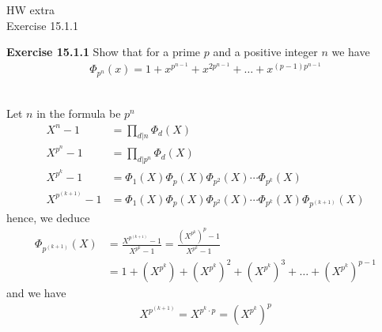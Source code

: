 \documentclass{article}
\begin{document}
\maketitle
HW extra \\
Exercise 15.1.1\\
\pagebreak

\begin{homeworkProblem}
    \textbf{Exercise 15.1.1} Show that for a prime $p$ and a positive integer $n$ we have
    \begin{align}
        \Phi_{p^n} (x) = 1 + x^{p^{n-1}} + x^{2 p^{n-1}} + \ldots + x^{(p-1) p^{n-1}}
    \end{align}
    
    \solution \\

    Let $n$ in the formula be $p^n$
    \begin{align}
        X^n -1 &= \prod_{d | n} \Phi_{d} (X)\\
        X^{p^n} - 1 &= \prod_{d | p^n} \Phi_d (X)\\
        X^{p^k} - 1 &= \Phi_1(X) \Phi_{p}(X) \Phi_{p^2}(X) \cdots \Phi_{p^k}(X) \\
        X^{p^{(k+1)}} - 1 &= \Phi_1(X) \Phi_{p}(X) \Phi_{p^2}(X) \cdots \Phi_{p^k}(X) \Phi_{p^{(k+1)}}(X)
    \end{align}
    hence, we deduce 
    \begin{align}
        \Phi_{p^{(k+1)}}(X) &= \frac{ X^{ p^{(k+1) }} - 1 }{ X^{ p^k } - 1 } = \frac{ \left( X^{p^k} \right)^p - 1}{ X^{p^k} - 1 } \\
        &= 1 + \left( X^{p^k} \right) + \left( X^{p^k} \right)^2 + \left( X^{p^k} \right)^3 + \ldots + \left( X^{p^k} \right)^{p-1}
    \end{align}
    and we have
    \begin{align}
        X^{p^{(k+1)}} = X^{p^k \cdot p} = \left( X^{p^k} \right)^p
    \end{align}
    
    
    



\end{homeworkProblem}

\pagebreak
\end{document}
